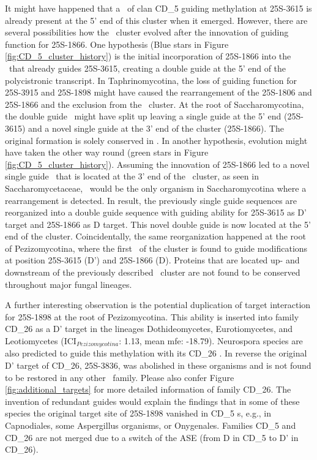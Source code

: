 It might have happened that a \sno\ of clan CD\_5 guiding
methylation at 25S-3615 is already present at the 5' end of this
cluster when it emerged. However, there are several possibilities how
the \sno\ cluster evolved after the innovation of guiding function for 25S-1866. 
One hypothesis (Blue stars in Figure \ref{fig:CD_5_cluster_history}) is the initial incorporation of 25S-1866 into the \sno\
that already guides 25S-3615, creating a double guide \sno at the 5'
end of the polycistronic transcript. In Taphrinomycotina, the loss of
guiding function for 25S-3915 and 25S-1898  might have caused the
rearrangement of the 25S-1806 and 25S-1866 and the exclusion from the
\sno\ cluster. At the root of Saccharomycotina, the double guide \sno\
might have split up leaving a single guide at the 5' end (25S-3615)
and a novel single guide at the 3' end of the cluster
(25S-1866). The original formation is solely conserved in
\Yli. In another hypothesis, evolution might have taken the other
way round (green stars in Figure
\ref{fig:CD_5_cluster_history}). Assuming the innovation of 25S-1866
led to a novel single guide \sno\ that is located at the 3' end of the
\sno\ cluster, as seen in Saccharomycetaceae, \yli\ would be the only
organism in Saccharomycotina where a  rearrangement is detected. In
result, the previously single guide sequences are reorganized into a
double guide sequence  with guiding ability for
25S-3615 as D' target and 25S-1866 as D target. This novel double guide is now located at the 5' end of the
cluster. 
Coincidentally, the same reorganization happened at the root
of Pezizomycotina, where the first \sno\ of the cluster is found to
guide modifications at position 25S-3615 (D') and 25S-1866
(D). Proteins that are located up- and downstream of the previously
described \sno\ cluster are not found to be conserved throughout major
fungal lineages.


A further interesting observation is the potential duplication of
target interaction for 25S-1898 at the root of Pezizomycotina. This
ability is inserted into family CD\_26 as a D' target in the lineages
Dothideomycetes, Eurotiomycetes, and Leotiomycetes
(ICI$_{Pezizomycotina}$: 1.13, mean
mfe: -18.79). Neurospora species
are also predicted to guide this methylation with its CD\_26 \sno. In reverse the
original D' target of CD\_26, 25S-3836, was abolished in these
organisms and is not found to be restored in any other \sno\ family.
Please also confer Figure \ref{fig:additional_targets} for more
detailed information of family CD\_26. The invention of redundant
guides would explain the findings that in some of these species the original target
site of 25S-1898 vanished in CD\_5 \sno s, e.g., in Capnodiales, some Aspergillus
organisms, or Onygenales. Families CD\_5 and CD\_26 are not merged due
to a switch of the ASE (from D in CD\_5 to D' in CD\_26). 





